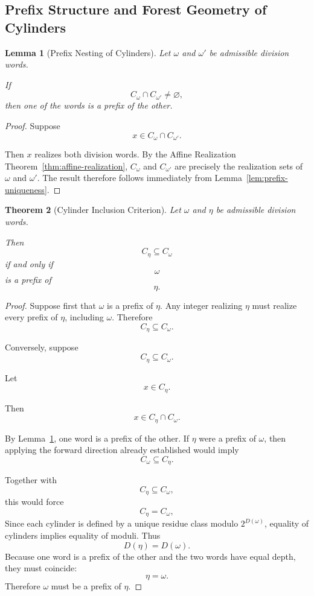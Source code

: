 \documentclass[12pt, oneside]{article}
\numberwithin{equation}{section}
\theoremstyle{definition}
\theoremstyle{plain}
\newtheorem{theorem}{Theorem}[section]
\newtheorem{lemma}[theorem]{Lemma}
\theoremstyle{remark}
\begin{document}
\subsection{Prefix Structure and Forest Geometry of Cylinders}

\begin{lemma}[Prefix Nesting of Cylinders]
\label{lem:cylinder-prefix-nesting}
Let $\omega$ and $\omega'$ be admissible division words.

If
\[
C_\omega\cap C_{\omega'}\neq\varnothing,
\]
then one of the words is a prefix of the other.
\end{lemma}

\begin{proof}
Suppose
\[
x\in C_\omega\cap C_{\omega'}.
\]

Then $x$ realizes both division words. By the Affine Realization
Theorem~\ref{thm:affine-realization}, $C_\omega$ and $C_{\omega'}$
are precisely the realization sets of $\omega$ and $\omega'$.
The result therefore follows immediately from
Lemma~\ref{lem:prefix-uniqueness}.
\end{proof}

\begin{theorem}[Cylinder Inclusion Criterion]
\label{thm:cylinder-inclusion}
Let $\omega$ and $\eta$ be admissible division words.

Then
\[
C_\eta\subseteq C_\omega
\]
if and only if
\[
\omega
\]
is a prefix of
\[
\eta.
\]
\end{theorem}

\begin{proof}
Suppose first that $\omega$ is a prefix of $\eta$.
Any integer realizing $\eta$ must realize every prefix of $\eta$,
including $\omega$. Therefore
\[
C_\eta\subseteq C_\omega.
\]

Conversely, suppose
\[
C_\eta\subseteq C_\omega.
\]

Let
\[
x\in C_\eta.
\]

Then
\[
x\in C_\eta\cap C_\omega.
\]

By Lemma~\ref{lem:cylinder-prefix-nesting}, one word is a prefix
of the other. If $\eta$ were a prefix of $\omega$, then applying
the forward direction already established would imply
\[
C_\omega\subseteq C_\eta.
\]

Together with
\[
C_\eta\subseteq C_\omega,
\]
this would force
\[
C_\eta=C_\omega,
\]
Since each cylinder is defined by a unique residue class modulo
\(2^{D(\omega)}\), equality of cylinders implies equality of moduli.  Thus
\[
D(\eta)=D(\omega).
\]
Because one word is a prefix of the other and the two words have equal
depth, they must coincide:
\[
\eta=\omega.
\]
Therefore $\omega$ must be a prefix of $\eta$.
\end{proof}
\end{document}
